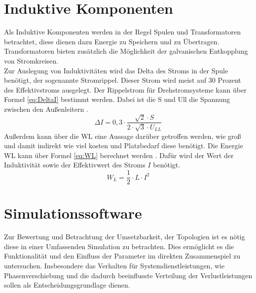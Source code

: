 \section{Induktive Komponenten}
	Als Induktive Komponenten werden in der Regel Spulen und Transformatoren betrachtet, diese dienen dazu Energie zu Speichern und zu Übertragen. Transformatoren bieten zusätzlich die Möglichkeit der galvanischen Entkopplung von Stromkreisen.\\ 
	Zur Auslegung von Induktivitäten wird das Delta des Stroms in der Spule benötigt, der sogenannte Stromrippel. Dieser Strom wird meist auf 30 Prozent des Effektivstroms ausgelegt. Der Rippelstrom für Drehstromsysteme kann über Formel \ref{eq:DeltaI} bestimmt werden. Dabei ist die \gls{S} und \gls{Ull} die Spannung zwischen den Außenleitern \cite{Boge.2007}.\\
	\begin{equation}
		\label{eq:DeltaI}
		 \Delta I = 0,3 \cdot \dfrac{\sqrt{2} \cdot S}{2 \cdot \sqrt{3} \cdot U_{LL}}
	\end{equation}
	Außerdem kann über die \gls{WL} eine Aussage darüber getroffen werden, wie groß und damit indirekt wie viel kosten und Platzbedarf diese benötigt. Die Energie \gls{WL} kann über Formel \ref{eq:WL} berechnet werden \cite{Boge.2007}. Dafür wird der Wert der Induktivität sowie der Effektivwert des Stroms $I$ benötigt.
	\begin{equation}
		\label{eq:WL}
		W_{L} =\dfrac{1}{2}\cdot L\cdot I^{2}
	\end{equation}
	



\section{Simulationssoftware}
	Zur Bewertung und Betrachtung der Umsetzbarkeit, der Topologien ist es nötig diese in einer Umfassenden Simulation zu betrachten. Dies ermöglicht es die Funktionalität und den Einfluss der Parameter im direkten Zusammenspiel zu untersuchen. Insbesondere das Verhalten für Systemdienstleistungen, wie Phasenverschiebung und die dadurch beeinflusste Verteilung der Verlustleistungen sollen als Entscheidungsgrundlage dienen. 

